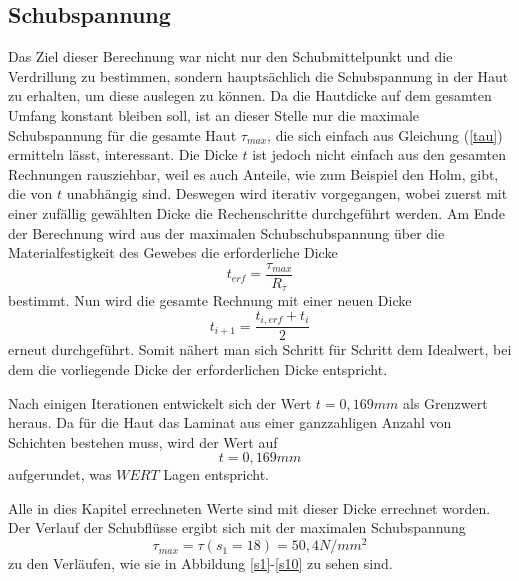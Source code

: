 \subsection{Schubspannung}
Das Ziel dieser Berechnung war nicht nur den Schubmittelpunkt und die Verdrillung zu bestimmen, sondern hauptsächlich die Schubspannung in der Haut zu erhalten, um diese auslegen zu können. Da die Hautdicke auf dem gesamten Umfang konstant bleiben soll, ist an dieser Stelle nur die maximale Schubspannung für die gesamte Haut $\tau_{max}$, die sich einfach aus Gleichung (\ref{tau}) ermitteln lässt, interessant. Die Dicke $t$ ist jedoch nicht einfach aus den gesamten Rechnungen rausziehbar, weil es auch Anteile, wie zum Beispiel den Holm, gibt, die von $t$ unabhängig sind. Deswegen wird iterativ vorgegangen, wobei zuerst mit einer zufällig gewählten Dicke die Rechenschritte durchgeführt werden. Am Ende der Berechnung wird aus der maximalen Schubschubspannung über die Materialfestigkeit des Gewebes die erforderliche Dicke \begin{equation}
	t_{erf} = \frac{\tau_{max}}{R_{\tau}}
\end{equation} bestimmt. Nun wird die gesamte Rechnung mit einer neuen Dicke
\begin{equation}
	t_{i+1} =\frac{t_{i,erf}+t_{i}}{2}
\end{equation}
erneut durchgeführt. Somit nähert man sich Schritt für Schritt dem Idealwert, bei dem die vorliegende Dicke der erforderlichen Dicke entspricht.

Nach einigen Iterationen entwickelt sich der Wert $t = 0,169 mm$ als Grenzwert heraus. Da für die Haut das Laminat aus einer ganzzahligen Anzahl von Schichten bestehen muss, wird der Wert auf 
\begin{equation}
	t = 0,169 mm
\end{equation}
aufgerundet, was $WERT$ Lagen entspricht.

Alle in dies Kapitel errechneten Werte sind mit dieser Dicke errechnet worden. Der Verlauf der Schubflüsse ergibt sich mit der maximalen Schubspannung
\begin{equation}
\tau_{max}=\tau(s_1=18)=50,4 N/mm^2
\end{equation}
zu den Verläufen, wie sie in Abbildung \ref{s1}-\ref{s10} zu sehen sind.








